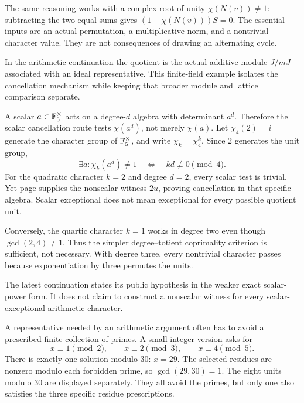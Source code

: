 The same reasoning works with a complex root of unity $\chi(N(v))\ne1$: subtracting the two equal sums gives $(1-\chi(N(v)))S=0$. The essential inputs are an actual permutation, a multiplicative norm, and a nontrivial character value. They are not consequences of drawing an alternating cycle.

In the arithmetic continuation the quotient is the actual additive module $J/mJ$ associated with an ideal representative. This finite-field example isolates the cancellation mechanism while keeping that broader module and lattice comparison separate.

A scalar $a\in\mathbb F_5^\times$ acts on a degree-$d$ algebra with determinant $a^d$. Therefore the scalar cancellation route tests $\chi(a^d)$, not merely $\chi(a)$.
Let $\chi_4(2)=i$ generate the character group of $\mathbb F_5^\times$, and write $\chi_k=\chi_4^k$. Since $2$ generates the unit group,
\[
\exists a:\chi_k(a^d)\ne1
\quad\Longleftrightarrow\quad kd\not\equiv0\pmod4.
\]
For the quadratic character $k=2$ and degree $d=2$, every scalar test is trivial. Yet page  supplies the nonscalar witness $2u$, proving cancellation in that specific algebra. Scalar exceptional does not mean exceptional for every possible quotient unit.

Conversely, the quartic character $k=1$ works in degree two even though $\gcd(2,4)\ne1$. Thus the simpler degree--totient coprimality criterion is sufficient, not necessary. With degree three, every nontrivial character passes because exponentiation by three permutes the units.

The latest continuation states its public hypothesis in the weaker exact scalar-power form. It does not claim to construct a nonscalar witness for every scalar-exceptional arithmetic character.

A representative needed by an arithmetic argument often has to avoid a prescribed finite collection of primes. A small integer version asks for
\[
x\equiv1\pmod2,\qquad x\equiv2\pmod3,\qquad x\equiv4\pmod5.
\]
There is exactly one solution modulo 30: $x=29$.
The selected residues are nonzero modulo each forbidden prime, so $\gcd(29,30)=1$. The eight units modulo 30 are displayed separately. They all avoid the primes, but only one also satisfies the three specific residue prescriptions.

